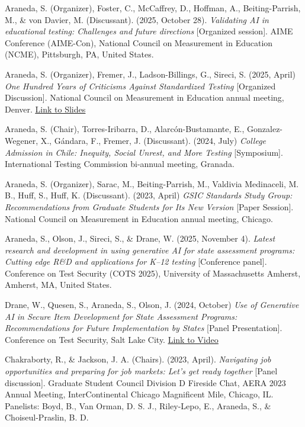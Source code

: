 \documentclass[10.5pt]{article}
\newcommand{\link}[2]{\href{#1}{\color{cvaccent}\uline{#2}}}
\newcommand{\cvsubsection}[1]{%
  \Needspace{3\baselineskip}\par\vspace{9pt}{\bfseries\fontsize{10.5}{13}\selectfont\color{cvaccent} \MakeUppercase{#1}}\par\vspace{4pt}%
}
\newcommand{\pubentry}[2]{%
  \par\noindent\hangindent=14pt\hangafter=1\raggedright\color{cvink}#1\par\vspace{9pt}%
}
\begin{document}
\pubentry{Araneda, S. (Organizer), Foster, C., McCaffrey, D., Hoffman, A., Beiting-Parrish, M., \& von Davier, M. (Discussant). (2025, October 28). \textit{Validating AI in educational testing: Challenges and future directions} [Organized session]. AIME Conference (AIME-Con), National Council on Measurement in Education (NCME), Pittsburgh, PA, United States.}{aimecon.png}
\pubentry{Araneda, S. (Organizer), Fremer, J., Ladson-Billings, G., Sireci, S. (2025, April) \textit{One Hundred Years of Criticisms Against Standardized Testing} [Organized Discussion]. National Council on Measurement in Education annual meeting, Denver. \link{https://www.researchgate.net/publication/391704152_100_years_of_criticisms_against_standardized_testing}{Link to Slides}}{ncme.png}
\pubentry{Araneda, S. (Chair), Torres-Iribarra, D., Alarc\'on-Bustamante, E., Gonzalez-Wegener, X., G\'andara, F., Fremer, J. (Discussant). (2024, July) \textit{College Admission in Chile: Inequity, Social Unrest, and More Testing} [Symposium]. International Testing Commission bi-annual meeting, Granada.}{itc.png}
\pubentry{Araneda, S. (Organizer), Sarac, M., Beiting-Parrish, M., Valdivia Medinaceli, M. B., Huff, S., Huff, K. (Discussant). (2023, April) \textit{GSIC Standards Study Group: Recommendations from Graduate Students for Its New Version} [Paper Session]. National Council on Measurement in Education annual meeting, Chicago.}{ncme.png}
\cvsubsection{Panel Participation}
\pubentry{Araneda, S., Olson, J., Sireci, S., \& Drane, W. (2025, November 4). \textit{Latest research and development in using generative AI for state assessment programs: Cutting edge R\&D and applications for K--12 testing} [Conference panel]. Conference on Test Security (COTS 2025), University of Massachusetts Amherst, Amherst, MA, United States.}{cots2025.png}
\pubentry{Drane, W., Quesen, S., Araneda, S., Olson, J. (2024, October) \textit{Use of Generative AI in Secure Item Development for State Assessment Programs: Recommendations for Future Implementation by States} [Panel Presentation]. Conference on Test Security, Salt Lake City. \link{https://www.youtube.com/watch?v=Jz-2YqcuPTM}{Link to Video}}{cots_generic.jpg}
\pubentry{Chakraborty, R., \& Jackson, J. A. (Chairs). (2023, April). \textit{Navigating job opportunities and preparing for job markets: Let's get ready together} [Panel discussion]. Graduate Student Council Division D Fireside Chat, AERA 2023 Annual Meeting, InterContinental Chicago Magnificent Mile, Chicago, IL. Panelists: Boyd, B., Van Orman, D. S. J., Riley-Lepo, E., Araneda, S., \& Choiseul-Praslin, B. D.}{aera.png}
\end{document}
